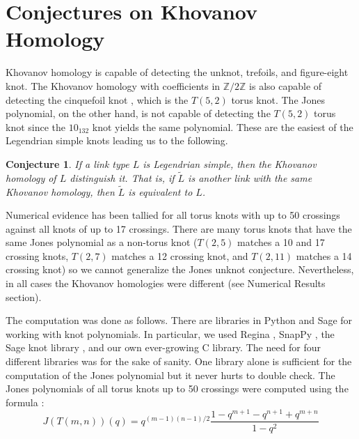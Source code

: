 \documentclass{article}
\theoremstyle{plain}
\newtheorem{conjecture}{Conjecture}
\begin{document}
    \section{Conjectures on Khovanov Homology}
        Khovanov homology is capable of detecting the
        unknot, trefoils, and figure-eight knot. The Khovanov homology with
        coefficients in $\mathbb{Z}/2\mathbb{Z}$ is also capable of detecting
        the cinquefoil knot \cite{BaldwinYingSivekCinquefoilKhovanov},
        which is the $T(5,2)$ torus knot. The Jones
        polynomial, on the other hand, is not capable of detecting the
        $T(5,2)$ torus knot since the $10_{132}$ knot yields the same
        polynomial. These are the easiest of the Legendrian simple knots
        leading us to the following.
        \begin{conjecture}
            If a link type $L$ is Legendrian simple, then the Khovanov homology
            of $L$ distinguish it. That is, if $\tilde{L}$
            is another link with the same Khovanov homology, then $\tilde{L}$ is
            equivalent to $L$.
        \end{conjecture}
        Numerical evidence has been tallied for all torus knots with up to 50
        crossings against all knots of up to 17 crossings. There are many
        torus knots that have the same Jones polynomial as a non-torus knot
        ($T(2,5)$ matches a 10 and 17 crossing knots, $T(2,7)$
        matches a 12 crossing knot, and $T(2,11)$ matches a 14 crossing knot)
        so we cannot generalize the Jones unknot conjecture. Nevertheless, in
        all cases the Khovanov homologies were different
        (see Numerical Results section).
        \par\hfill\par
        The computation was done as follows. There are libraries in Python and
        Sage for working with knot polynomials. In particular, we used
        Regina \cite{regina}, SnapPy \cite{SnapPy}, the Sage knot library
        \cite{sage}, and our own ever-growing C library. The need for four
        different libraries was for the sake of sanity. One library alone is
        sufficient for the computation of the Jones polynomial but it never
        hurts to double check. The Jones polynomials of all torus knots up to
        50 crossings were computed using the formula
        \cite{jonesfordummyvjones}:
        \begin{equation}
            \label{eqn:jones_poly_torus}%
            J(T(m,n))(q)=q^{(m-1)(n-1)/2}
                \frac{1-q^{m+1}-q^{n+1}+q^{m+n}}{1-q^{2}}
        \end{equation}
\end{document}
